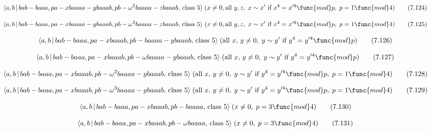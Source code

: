 \documentclass[10pt]{article}
\begin{document}
\begin{equation}
\langle a,b\,|\,bab-baaa,pa-xbaaaa-ybaaab,pb-\omega ^{2}baaaa-zbaaab,\,\text{%
class }5\rangle \;(x\neq 0,\text{all }y,z,\;x\sim x^{\prime }\text{ if }%
x^{4}=x^{\prime 4}\func{mod}p,\;p=1\func{mod}4)  \tag{7.124}
\end{equation}

\begin{equation}
\langle a,b\,|\,bab-baaa,pa-xbaaaa-ybaaab,pb-\omega ^{3}baaaa-zbaaab,\,\text{%
class }5\rangle \;(x\neq 0,\text{all }y,z,\;x\sim x^{\prime }\text{ if }%
x^{4}=x^{\prime 4}\func{mod}p,\;p=1\func{mod}4)  \tag{7.125}
\end{equation}

\begin{equation}
\langle a,b\,|\,bab-baaa,pa-xbaaab,pb-baaaa-ybaaab,\,\text{class }5\rangle
\;(\text{all }x,\,y\neq 0,\;y\sim y^{\prime }\text{ if }y^{4}=y^{\prime 4}%
\func{mod}p)  \tag{7.126}
\end{equation}

\begin{equation}
\langle a,b\,|\,bab-baaa,pa-xbaaab,pb-\omega baaaa-ybaaab,\,\text{class }%
5\rangle \;(\text{all }x,\,y\neq 0,\;y\sim y^{\prime }\text{ if }%
y^{4}=y^{\prime 4}\func{mod}p)  \tag{7.127}
\end{equation}

\begin{equation}
\langle a,b\,|\,bab-baaa,pa-xbaaab,pb-\omega ^{2}baaaa-ybaaab,\,\text{class }%
5\rangle \;(\text{all }x,\,y\neq 0,\;y\sim y^{\prime }\text{ if }%
y^{4}=y^{\prime 4}\func{mod}p,\;p=1\func{mod}4)  \tag{7.128}
\end{equation}

\begin{equation}
\langle a,b\,|\,bab-baaa,pa-xbaaab,pb-\omega ^{3}baaaa-ybaaab,\,\text{class }%
5\rangle \;(\text{all }x,\,y\neq 0,\;y\sim y^{\prime }\text{ if }%
y^{4}=y^{\prime 4}\func{mod}p,\;p=1\func{mod}4)  \tag{7.129}
\end{equation}

\begin{equation}
\langle a,b\,|\,bab-baaa,pa-xbaaab,pb-baaaa,\,\text{class }5\rangle \;(x
\neq 0,\;p=3 \func{mod} 4)  \tag{7.130}
\end{equation}

\begin{equation}
\langle a,b\,|\,bab-baaa,pa-xbaaab,pb-\omega baaaa,\,\text{class }5\rangle
\;(x\neq 0,\;p=3\func{mod}4)  \tag{7.131}
\end{equation}
\end{document}
